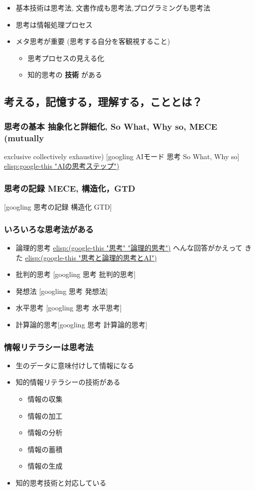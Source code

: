 \documentclass[dvipdfmx,11pat]{jarticle}
\begin{document}
\begin{itemize}
\item 基本技術は思考法, 文書作成も思考法,プログラミングも思考法
\item 思考は情報処理プロセス
\item メタ思考が重要 (思考する自分を客観視すること)
\begin{itemize}
\item 思考プロセスの見える化
\item 知的思考の \textbf{技術} がある
\end{itemize}
\end{itemize}
\subsection{考える，記憶する，理解する，こととは？}
\label{sec:org11bc8bb}
\subsubsection{思考の基本 抽象化と詳細化, So What, Why so, MECE (mutually}
\label{sec:org9965ab0}
exclusive collectively exhaustive)
{[}googling AIモード 思考 So What, Why so]
\url{elisp:google-this "AIの思考ステップ")}
\subsubsection{思考の記録 MECE, 構造化，GTD}
\label{sec:org342ecd8}
{[}googling 思考の記録 構造化 GTD]
\subsubsection{いろいろな思考法がある}
\label{sec:org9a6c8d1}
\begin{itemize}
\item 論理的思考  \url{elisp:(google-this "思考" "論理的思考")} へんな回答がかえって
きた
\url{elisp:(google-this "思考と論理的思考とAI")}

\item 批判的思考 [googling 思考 批判的思考]
\item 発想法 [googling 思考 発想法]
\item 水平思考 [googling 思考 水平思考]
\item 計算論的思考[googling 思考 計算論的思考]
\end{itemize}
\subsubsection{情報リテラシーは思考法}
\label{sec:org33fe318}
\begin{itemize}
\item 生のデータに意味付けして情報になる
\item 知的情報リテラシーの技術がある
\begin{itemize}
\item 情報の収集
\item 情報の加工
\item 情報の分析
\item 情報の蓄積
\item 情報の生成
\end{itemize}
\item 知的思考技術と対応している
\end{itemize}
\end{document}
